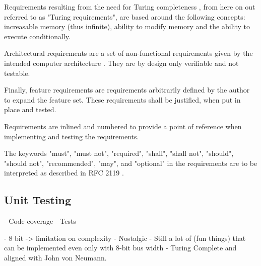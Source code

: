 Requirements resulting from the need for Turing completeness \cite{turing1936a}, from here on out referred to as "Turing requirements", are based around the following concepts: increasable memory (thus infinite), ability to modify memory and the ability to execute conditionally. 

Architectural requirements are a set of non-functional requirements given by the intended computer architecture \cite{vonneuman1945a}. They are by design only verifiable and not testable. 

Finally, feature requirements are requirements arbitrarily defined by the author to expand the feature set. These requirements shall be justified, when put in place and tested.

Requirements are inlined and numbered to provide a point of reference when implementing and testing the requirements. 

\newtheorem{turing-requirement}{Turing Req.}[subsection]
\newtheorem{arch-requirement}{Arch. Req.}[subsection]
\newtheorem{feat-requirement}{Feat. Req.}[subsection]

The keywords "must", "must not", "required", "shall", "shall not", "should", "should not", "recommended",  "may", and "optional" in the requirements are to be interpreted as described in RFC 2119 \cite{rfc2119}.

\subsection{Unit Testing}
- Code coverage
- Tests



- 8 bit -> limitation on complexity
- Nostalgic
- Still a lot of (fun things) that can be implemented even only with 8-bit bus width
- Turing Complete and aligned with John von Neumann.



